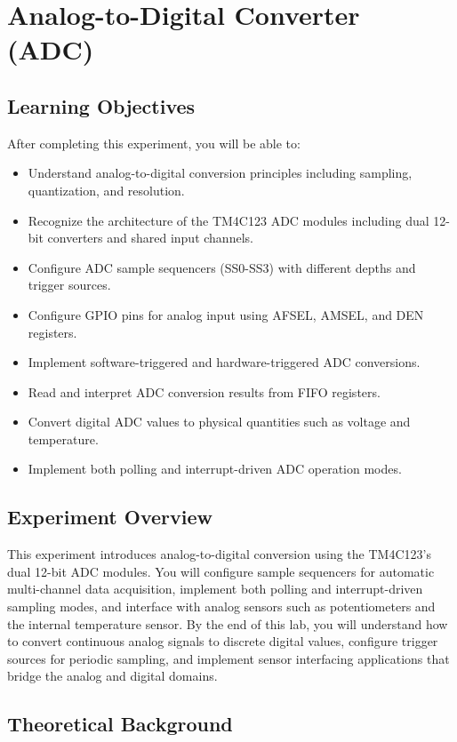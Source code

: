 \chapter{Analog-to-Digital Converter (ADC)}

\section*{Learning Objectives}
After completing this experiment, you will be able to:
\begin{itemize}[nosep]
  \item Understand analog-to-digital conversion principles including sampling, quantization, and resolution.
  \item Recognize the architecture of the TM4C123 ADC modules including dual 12-bit converters and shared input channels.
  \item Configure ADC sample sequencers (SS0-SS3) with different depths and trigger sources.
  \item Configure GPIO pins for analog input using AFSEL, AMSEL, and DEN registers.
  \item Implement software-triggered and hardware-triggered ADC conversions.
  \item Read and interpret ADC conversion results from FIFO registers.
  \item Convert digital ADC values to physical quantities such as voltage and temperature.
  \item Implement both polling and interrupt-driven ADC operation modes.
\end{itemize}

\section*{Experiment Overview}
This experiment introduces analog-to-digital conversion using the TM4C123's dual 12-bit ADC modules. You will configure sample sequencers for automatic multi-channel data acquisition, implement both polling and interrupt-driven sampling modes, and interface with analog sensors such as potentiometers and the internal temperature sensor. By the end of this lab, you will understand how to convert continuous analog signals to discrete digital values, configure trigger sources for periodic sampling, and implement sensor interfacing applications that bridge the analog and digital domains.

\newpage


\section{Theoretical Background}

